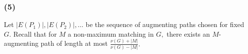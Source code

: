 \documentclass{article}
\begin{document}









  \subsubsection*{(5)} Let $|E(P_1)|,|E(P_2)|,\dots$ be the sequence of augmenting paths chosen for fixed $G.$ Recall that for $M$ a non-maximum matching in $G,$ there exists an $M$-augmenting path of length at most $\frac{\nu(G)+|M|}{\nu(G)-|M|}.$
\end{document}
